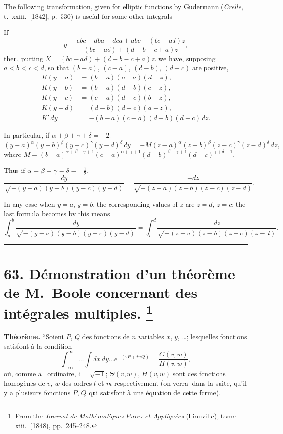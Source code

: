 \documentclass[11pt,a4paper]{article}
\theoremstyle{plain}
\theoremstyle{definition}
\begin{document}
The following transformation, given for elliptic functions by Gudermann (\textit{Crelle},
t.~xxiii.\ [1842], p.~330) is useful for some other integrals.

If
\[
y = \frac{abc - dba - dca + abc - (bc - ad)z}{(bc - ad) + (d - b - c + a)z},
\]
then, putting $K = (bc - ad) + (d - b - c + a)z$,
we have, supposing $a < b < c < d$, so that $(b-a)$, $(c-a)$, $(d-b)$, $(d-c)$ are positive,
\begin{align*}
K(y-a) &= (b-a)(c-a)(d-z), \\
K(y-b) &= (b-a)(d-b)(c-z), \\
K(y-c) &= (c-a)(d-c)(b-z), \\
K(y-d) &= (d-b)(d-c)(a-z), \\
K'\,dy &= -(b-a)(c-a)(d-b)(d-c)\,dz.
\end{align*}

In particular, if $\alpha + \beta + \gamma + \delta = -2$,
\[
(y-a)^\alpha (y-b)^\beta (y-c)^\gamma (y-d)^\delta\,dy
= -M (z-a)^\alpha (z-b)^\beta (z-c)^\gamma (z-d)^\delta\,dz,
\]
where $M = (b-a)^{\alpha+\beta+\gamma+1} (c-a)^{\alpha+\gamma+1} (d-b)^{\beta+\gamma+1} (d-c)^{\gamma+\delta+1}$.

Thus if $\alpha = \beta = \gamma = \delta = -\tfrac{1}{2}$,
\[
\frac{dy}{\sqrt{-(y-a)(y-b)(y-c)(y-d)}}
= \frac{-dz}{\sqrt{-(z-a)(z-b)(z-c)(z-d)}}.
\]

In any case when $y = a$, $y = b$, the corresponding values of $z$ are $z = d$, $z = c$; the
last formula becomes by this means
\[
\int_a^b \frac{dy}{\sqrt{-(y-a)(y-b)(y-c)(y-d)}}
= \int_c^d \frac{dz}{\sqrt{-(z-a)(z-b)(z-c)(z-d)}}.
\]

\bigskip
\hrule
\bigskip

\newpage
\section[D\'{e}monstration d'un th\'{e}or\`{e}me de M.~Boole concernant des int\'{e}grales multiples]{%
63. D\'{e}monstration d'un th\'{e}or\`{e}me de M.~Boole concernant des int\'{e}grales multiples.%
\footnote{From the \textit{Journal de Math\'{e}matiques Pures et Appliqu\'{e}es} (Liouville), tome xiii.\ (1848), pp.~245--248.}}

\textbf{Th\'{e}or\`{e}me.}
``Soient $P$, $Q$ des fonctions de $n$ variables $x$, $y$, \ldots; lesquelles fonctions
satisfont \`{a} la condition
\[
\int_{-\infty}^{\infty} \ldots \int dx\,dy\ldots e^{-(vP + iwQ)} = \frac{G(v,w)}{H(v,w)}, \tag{1}
\]
o\`{u}, comme \`{a} l'ordinaire, $i = \sqrt{-1}$; $\Theta(v,w)$, $H(v,w)$ sont des fonctions homog\`{e}nes
de $v$, $w$ des ordres $l$ et $m$ respectivement (on verra, dans la suite, qu'il y a plusieurs
fonctions $P$, $Q$ qui satisfont \`{a} une \'{e}quation de cette forme).
\end{document}
